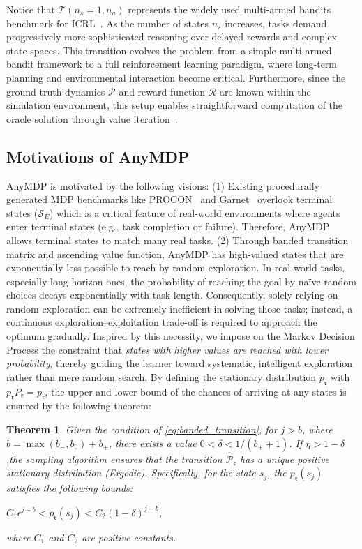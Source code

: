 \documentclass{article}
\newtheorem{theorem}{Theorem}
\begin{document}
Notice that $\mathcal{T}(n_s=1, n_a)$ represents the widely used multi-armed bandits benchmark for ICRL~\citep{duan2016rl,lee2024supervised,mishra2018simple}. As the number of states $n_s$ increases, tasks demand progressively more sophisticated reasoning over delayed rewards and complex state spaces. This transition evolves the problem from a simple multi-armed bandit framework to a full reinforcement learning paradigm, where long-term planning and environmental interaction become critical. Furthermore, since the ground truth dynamics $\mathcal{P}$ and reward function $\mathcal{R}$ are known within the simulation environment, this setup enables straightforward computation of the oracle solution through value iteration~\citep{bellman1958dynamic}.
\subsection{Motivations of AnyMDP}
AnyMDP is motivated by the following visions: (1) Existing procedurally generated MDP benchmarks like PROCON~\citep{archibald1995generation} and Garnet~\citep{bhatnagar2009natural} overlook terminal states ($\mathcal{S}_E$) which is a critical feature of real-world environments where agents enter terminal states (e.g., task completion or failure). Therefore, AnyMDP allows terminal states to match many real tasks.
(2) Through banded transition matrix and ascending value function, AnyMDP has high-valued states that are exponentially less possible to reach by random exploration. In real-world tasks, especially long-horizon ones, the probability of reaching the goal by naïve random choices decays exponentially with task length. Consequently, solely relying on random exploration can be extremely inefficient in solving those tasks; instead, a continuous exploration–exploitation trade-off is required to approach the optimum gradually. Inspired by this necessity, we impose on the Markov Decision Process the constraint that \emph{states with higher values are reached with lower probability}, thereby guiding the learner toward systematic, intelligent exploration rather than mere random search.
By defining the stationary distribution $p_{\mathfrak{r}}$ with $p_{\mathfrak{r}} P_{\mathfrak{r}} = p_{\mathfrak{r}}$, the upper and lower bound of the chances of arriving at any states is ensured by the following theorem:
\begin{theorem}
Given the condition of \cref{eq:banded_transition}, for $j > b$, where $b=\max(b_{-}, b_0) + b_{+}$, there exists a value $0 < \delta < 1/(b_{+}+1)$. If $\eta > 1-\delta$,the sampling algorithm ensures that the transition $\hat{\mathcal{P}}_{\mathfrak{r}}$ has a unique positive stationary distribution (Ergodic). Specifically, for the state $s_j$, the $p_\mathfrak{r}(s_j)$ satisfies the following bounds:
\begin{center}
$C_1\epsilon^{j-b}< p_\mathfrak{r}(s_j) < C_2(1-\delta)^{j-b}$,
\end{center}
where $C_1$ and $C_2$ are positive constants.
\label{theory:mc}
\end{theorem}
\end{document}
